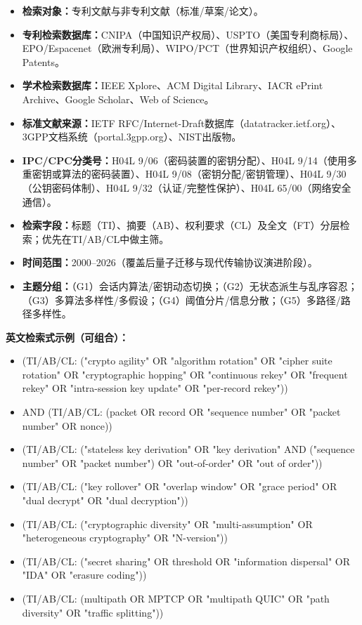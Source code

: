 \documentclass[12pt,a4paper]{article}
\begin{document}
\begin{itemize}[leftmargin=2em]
    \item \textbf{检索对象：}专利文献与非专利文献（标准/草案/论文）。
    \item \textbf{专利检索数据库：}CNIPA（中国知识产权局）、USPTO（美国专利商标局）、EPO/Espacenet（欧洲专利局）、WIPO/PCT（世界知识产权组织）、Google Patents。
    \item \textbf{学术检索数据库：}IEEE Xplore、ACM Digital Library、IACR ePrint Archive、Google Scholar、Web of Science。
    \item \textbf{标准文献来源：}IETF RFC/Internet-Draft数据库（datatracker.ietf.org）、3GPP文档系统（portal.3gpp.org）、NIST出版物。
    \item \textbf{IPC/CPC分类号：}H04L 9/06（密码装置的密钥分配）、H04L 9/14（使用多重密钥或算法的密码装置）、H04L 9/08（密钥分配/密钥管理）、H04L 9/30（公钥密码体制）、H04L 9/32（认证/完整性保护）、H04L 65/00（网络安全通信）。
    \item \textbf{检索字段：}标题（TI）、摘要（AB）、权利要求（CL）及全文（FT）分层检索；优先在TI/AB/CL中做主筛。
    \item \textbf{时间范围：}2000--2026（覆盖后量子迁移与现代传输协议演进阶段）。
    \item \textbf{主题分组：}（G1）会话内算法/密钥动态切换；（G2）无状态派生与乱序容忍；（G3）多算法多样性/多假设；（G4）阈值分片/信息分散；（G5）多路径/路径多样性。
\end{itemize}

\noindent\textbf{英文检索式示例（可组合）：}
\begin{itemize}[leftmargin=2em]
    \item (TI/AB/CL: ("crypto agility" OR "algorithm rotation" OR "cipher suite rotation" OR "cryptographic hopping" OR "continuous rekey" OR "frequent rekey" OR "intra-session key update" OR "per-record rekey"))
    \item AND (TI/AB/CL: (packet OR record OR "sequence number" OR "packet number" OR nonce))
    \item (TI/AB/CL: ("stateless key derivation" OR "key derivation" AND ("sequence number" OR "packet number") OR "out-of-order" OR "out of order"))
    \item (TI/AB/CL: ("key rollover" OR "overlap window" OR "grace period" OR "dual decrypt" OR "dual decryption"))
    \item (TI/AB/CL: ("cryptographic diversity" OR "multi-assumption" OR "heterogeneous cryptography" OR "N-version"))
    \item (TI/AB/CL: ("secret sharing" OR threshold OR "information dispersal" OR "IDA" OR "erasure coding"))
    \item (TI/AB/CL: (multipath OR MPTCP OR "multipath QUIC" OR "path diversity" OR "traffic splitting"))
\end{itemize}
\end{document}
